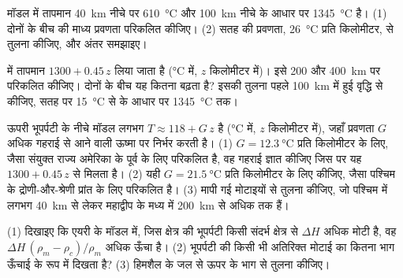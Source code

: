 \begin{exercise}[$\star\star$]\label{exo:g11:lithosphere-asthenosphere:10}
मॉडल  में तापमान \qty{40}{km} नीचे  पर \qty{610}{\celsius}
और \qty{100}{km} नीचे  के आधार पर \qty{1345}{\celsius} है।
(1) दोनों के बीच की माध्य प्रवणता परिकलित कीजिए। (2)
सतह की प्रवणता, \qty{26}{\celsius} प्रति किलोमीटर, से तुलना कीजिए,
और अंतर समझाइए।
\end{exercise}

\begin{exercise}[$\star\star$]\label{exo:g11:lithosphere-asthenosphere:11}
 में तापमान $1300 + 0.45\,z$ लिया जाता है
(\unit{\celsius} में, $z$ किलोमीटर में)। इसे 200 और \qty{400}{km} पर परिकलित कीजिए। दोनों के
बीच यह कितना बढ़ता है? इसकी तुलना पहले \qty{100}{km} में हुई वृद्धि से कीजिए,
सतह पर \qty{15}{\celsius} से  के आधार पर
\qty{1345}{\celsius} तक।
\end{exercise}

\begin{exercise}[$\star\star\star$]\label{exo:g11:lithosphere-asthenosphere:12}
ऊपरी भूपर्पटी के नीचे मॉडल  लगभग $T \approx 118 +
G\,z$ है (\unit{\celsius} में, $z$ किलोमीटर में), जहाँ प्रवणता $G$
अधिक गहराई से आने वाली ऊष्मा पर निर्भर करती है। (1) $G =
\qty{12.3}{\celsius}$ प्रति किलोमीटर के लिए, जैसा संयुक्त राज्य अमेरिका के पूर्व के लिए
परिकलित है, वह गहराई ज्ञात कीजिए जिस पर यह $1300 + 0.45\,z$ से मिलता है। (2) यही
$G = \qty{21.5}{\celsius}$ प्रति किलोमीटर के लिए कीजिए, जैसा पश्चिम के द्रोणी-और-श्रेणी
प्रांत के लिए परिकलित है। (3) मापी गई मोटाइयों से तुलना कीजिए, जो पश्चिम में लगभग
\qty{40}{km} से लेकर महाद्वीप के मध्य में \qty{200}{km} से अधिक तक हैं।
\end{exercise}

\begin{exercise}[$\star\star\star$]\label{exo:g11:lithosphere-asthenosphere:13}
(1) दिखाइए कि एयरी के मॉडल में, जिस क्षेत्र की भूपर्पटी किसी संदर्भ क्षेत्र से $\Delta H$ अधिक
मोटी है, वह $\Delta H\,(\rho_m - \rho_c)/\rho_m$ अधिक ऊँचा है।
(2) भूपर्पटी की किसी भी अतिरिक्त मोटाई का कितना भाग ऊँचाई के रूप में दिखता है? (3)
हिमशैल के जल से ऊपर के भाग से तुलना कीजिए।
\end{exercise}

